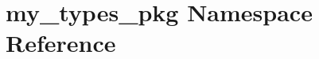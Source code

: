 \hypertarget{namespacemy__types__pkg}{}\section{my\+\_\+types\+\_\+pkg Namespace Reference}
\label{namespacemy__types__pkg}

